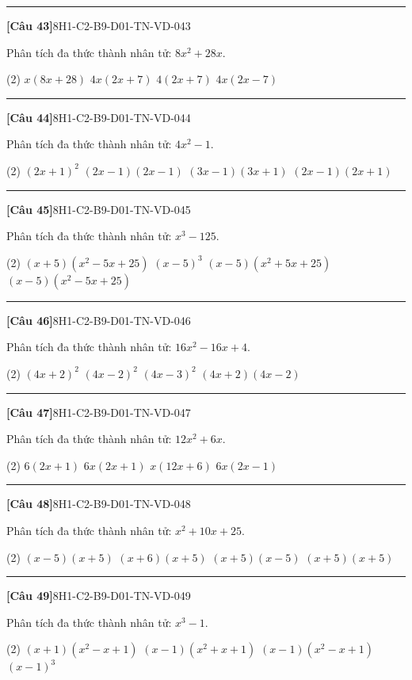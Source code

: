 \documentclass[12pt,a4paper]{article}
\newif\ifloigiai
\newenvironment{cauhoi}[2]{%
  \par\medskip\noindent\rule{\textwidth}{0.4pt}\par\nopagebreak
  \noindent\textbf{[#1]}\hfill{\scriptsize\ttfamily #2}\par\nopagebreak\smallskip}{\par}
\newcommand{\dapan}[1]{\ifloigiai\par\smallskip\noindent\textit{Đáp án:} \textbf{#1}\par\fi}
\begin{document}
\begin{cauhoi}{Câu 43}{8H1-C2-B9-D01-TN-VD-043}
Phân tích đa thức thành nhân tử: $8x^{2} + 28x$.
\begin{tasks}(2)
\task $x(8x + 28)$
\task $4x(2x + 7)$
\task $4(2x + 7)$
\task $4x(2x - 7)$
\end{tasks}
\dapan{B}
\end{cauhoi}
\begin{cauhoi}{Câu 44}{8H1-C2-B9-D01-TN-VD-044}
Phân tích đa thức thành nhân tử: $4x^{2} - 1$.
\begin{tasks}(2)
\task $(2x + 1)^{2}$
\task $(2x - 1)(2x - 1)$
\task $(3x - 1)(3x + 1)$
\task $(2x - 1)(2x + 1)$
\end{tasks}
\dapan{D}
\end{cauhoi}
\begin{cauhoi}{Câu 45}{8H1-C2-B9-D01-TN-VD-045}
Phân tích đa thức thành nhân tử: $x^{3}-125$.
\begin{tasks}(2)
\task $(x+5)(x^{2}-5x+25)$
\task $(x-5)^{3}$
\task $(x-5)(x^{2}+5x+25)$
\task $(x-5)(x^{2}-5x+25)$
\end{tasks}
\dapan{C}
\end{cauhoi}
\begin{cauhoi}{Câu 46}{8H1-C2-B9-D01-TN-VD-046}
Phân tích đa thức thành nhân tử: $16x^{2} - 16x + 4$.
\begin{tasks}(2)
\task $(4x + 2)^{2}$
\task $(4x - 2)^{2}$
\task $(4x - 3)^{2}$
\task $(4x + 2)(4x - 2)$
\end{tasks}
\dapan{B}
\end{cauhoi}
\begin{cauhoi}{Câu 47}{8H1-C2-B9-D01-TN-VD-047}
Phân tích đa thức thành nhân tử: $12x^{2} + 6x$.
\begin{tasks}(2)
\task $6(2x + 1)$
\task $6x(2x + 1)$
\task $x(12x + 6)$
\task $6x(2x - 1)$
\end{tasks}
\dapan{B}
\end{cauhoi}
\begin{cauhoi}{Câu 48}{8H1-C2-B9-D01-TN-VD-048}
Phân tích đa thức thành nhân tử: $x^{2} + 10x + 25$.
\begin{tasks}(2)
\task $(x - 5)(x + 5)$
\task $(x + 6)(x + 5)$
\task $(x + 5)(x - 5)$
\task $(x + 5)(x + 5)$
\end{tasks}
\dapan{D}
\end{cauhoi}
\begin{cauhoi}{Câu 49}{8H1-C2-B9-D01-TN-VD-049}
Phân tích đa thức thành nhân tử: $x^{3}-1$.
\begin{tasks}(2)
\task $(x+1)(x^{2}-x+1)$
\task $(x-1)(x^{2}+x+1)$
\task $(x-1)(x^{2}-x+1)$
\task $(x-1)^{3}$
\end{tasks}
\dapan{B}
\end{cauhoi}
\end{document}
